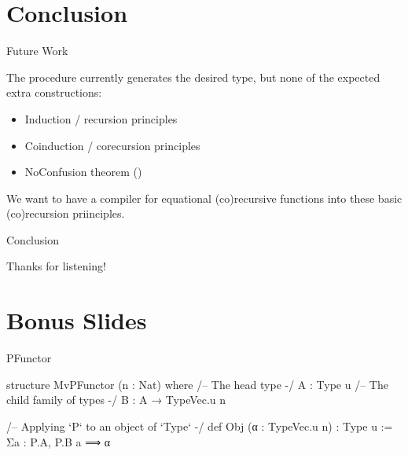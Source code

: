 \documentclass[t,12pt]{beamer}
\begin{document}
\section*{Conclusion}

\begin{frame}{Future Work}
    
    \vfill

    The procedure currently generates the desired type, but none of the expected extra constructions:

    \vfill
    \begin{itemize}
        \item Induction / recursion principles
        \item Coinduction / corecursion principles
        \item NoConfusion theorem ()
    \end{itemize}

    \vfill

    \pause{}

    We want to have a compiler for equational (co)recursive functions into these basic (co)recursion priinciples.

    \vfill

\end{frame}


\begin{frame}{Conclusion}

    \vfill

    \begin{center}
        Thanks for listening!
    \end{center}

    \vfill
    
\end{frame}







\section*{Bonus Slides}





\begin{frame}[fragile]{PFunctor}

    \vfill

    \begin{leancode}
structure MvPFunctor (n : Nat) where
    /-- The head type -/
    A : Type u
    /-- The child family of types -/
    B : A → TypeVec.{u} n
    \end{leancode}

    \vfill

\begin{leancode}
/-- Applying `P` to an object of `Type` -/
def Obj (α : TypeVec.{u} n) : Type u :=
  Σa : P.A, P.B a ⟹ α
\end{leancode}
    
    \vfill
\end{frame}
\end{document}
